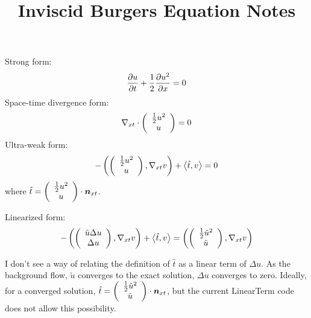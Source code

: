 \documentclass{article}
\title{Inviscid Burgers Equation Notes}
\date{}
\begin{document}
\maketitle
Strong form:
\[
\frac{\partial u}{\partial t}+\frac{1}{2}\frac{\partial u^2}{\partial x}=0
\]
Space-time divergence form:
\[
\nabla_{xt}\cdot{\left( \begin{array}{c} \frac{1}{2}u^2\\ u\\ \end{array} \right)}=0
\]
Ultra-weak form:
\[
-\left( \left( \begin{array}{c} \frac{1}{2}u^2\\ u\\ \end{array} \right),\nabla_{xt} v \right)+\left\langle \hat t,v \right\rangle=0
\]
where $\hat t=\left( \begin{array}{c} \frac{1}{2}u^2\\ u\\ \end{array} \right)\cdot\boldsymbol n_{xt}$.

Linearized form:
\[
-\left( \left( \begin{array}{c} \tilde u\Delta u\\ \Delta u\\ \end{array} \right),\nabla_{xt} v \right)+\left\langle \hat t,v \right\rangle=\left( \left( \begin{array}{c} \frac{1}{2}\tilde u^2\\ \tilde u\\ \end{array} \right),\nabla_{xt} v \right)
\]

I don't see a way of relating the definition of $\hat t$ as a linear term of $\Delta u$. 
As the background flow, $\tilde u$ converges to the exact solution, $\Delta u$ converges to zero. 
Ideally, for a converged solution, $\hat t=\left( \begin{array}{c} \frac{1}{2}\tilde u^2\\ \tilde u\\ \end{array} \right)\cdot\boldsymbol n_{xt}$,
but the current LinearTerm code does not allow this possibility.
\end{document}

